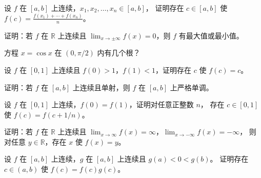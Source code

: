 \begin{exercise}[5]
设 \(f\) 在 \([a,b]\) 上连续，\(x_1,x_2,\ldots,x_n\in[a,b]\)，
证明存在 \(c\in[a,b]\) 使 \(f(c)=\frac{f(x_1)+\cdots+f(x_n)}{n}\)。
\end{exercise}
\begin{exercise}[5]
证明：若 \(f\) 在 \(\mathbb{R}\) 上连续且 \(\lim_{x\to\pm\infty}f(x)=0\)，则 \(f\) 有最大值或最小值。
\end{exercise}
\begin{exercise}[5]
方程 \(x = \cos x\) 在 \((0,\pi/2)\) 内有几个根？
\end{exercise}
\begin{exercise}[5]
设 \(f\) 在 \([0,1]\) 上连续且 \(f(0)>1\)，\(f(1)<1\)，证明存在 \(c\) 使 \(f(c)=c\)。
\end{exercise}

\begin{exercise}[6]
证明：若 \(f\) 在 \([a,b]\) 上连续且单射，则 \(f\) 在 \([a,b]\) 上严格单调。
\end{exercise}
\begin{exercise}[6]
设 \(f\) 在 \([0,1]\) 上连续，\(f(0)=f(1)\)，证明对任意正整数 \(n\)，
存在 \(c\in[0,1]\) 使 \(f(c)=f(c+1/n)\)。
\end{exercise}
\begin{exercise}[6]
证明：若 \(f\) 在 \(\mathbb{R}\) 上连续且 \(\lim_{x\to\infty}f(x)=\infty\)，\(\lim_{x\to-\infty}f(x)=-\infty\)，
则对任意 \(y\in\mathbb{R}\)，存在 \(x\) 使 \(f(x)=y\)。
\end{exercise}

\begin{exercise}[7]
设 \(f\) 在 \([a,b]\) 上连续，\(g\) 在 \([a,b]\) 上连续且 \(g(a)<0<g(b)\)。
证明存在 \(c\in(a,b)\) 使 \(f(c)=f(c)g(c)\)。
\end{exercise}

